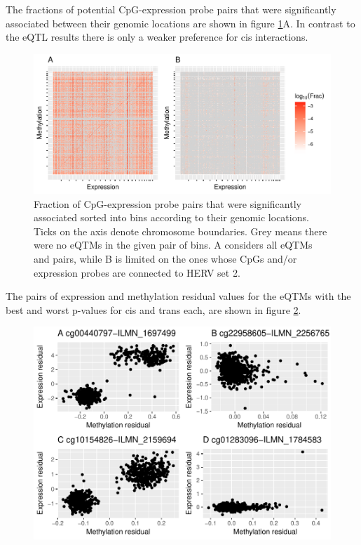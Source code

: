 \documentclass[a4paper,12pt,twoside,openright]{report}
\begin{document}
The fractions of potential CpG-expression probe pairs that were significantly associated between their genomic locations are shown in figure \ref{fig:global.eqtm.heatmap}A. In contrast to the eQTL results there is only a weaker preference for cis interactions. 

\begin{figure}[tb]
	\includegraphics[scale = 1, keepaspectratio = true]{../figures/eqtm_all_herv_heatmap}  
	\caption{Fraction of CpG-expression probe pairs that were significantly associated sorted into bins according to their genomic locations. Ticks on the axis denote chromosome boundaries. Grey means there were no eQTMs in the given pair of bins. A considers all eQTMs and pairs, while B is limited on the ones whose CpGs and/or expression probes are connected to HERV set 2.}
    \label{fig:global.eqtm.heatmap}
\end{figure}

The pairs of expression and methylation residual values for the eQTMs with the best and worst p-values for cis and trans each, are shown in figure \ref{fig:best.worst.eqtm.scatter}. 
\begin{figure}[tb]
	\includegraphics[scale = 1, keepaspectratio = true]{../figures/best_worst_eqtm_scatter.pdf}  
	\caption{}
    \label{fig:best.worst.eqtm.scatter}
\end{figure}
\end{document}
